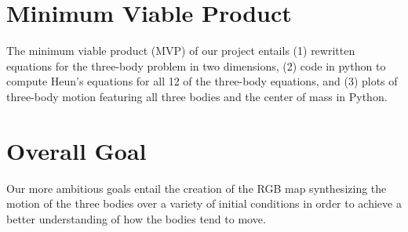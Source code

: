 \documentclass{article}
\begin{document}
\section{Minimum Viable Product}
The minimum viable product (MVP) of our project entails (1) rewritten equations for the three-body problem in two dimensions, (2) code in python to compute Heun’s equations for all 12 of the three-body equations, and (3) plots of three-body motion featuring all three bodies and the center of mass in Python. 

\section{Overall Goal}
Our more ambitious goals entail the creation of the RGB map synthesizing the motion of the three bodies over a variety of initial conditions in order to achieve a better understanding of how the bodies tend to move. 
\end{document}
